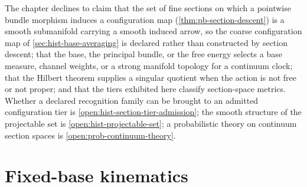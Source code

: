 The chapter declines to claim that the set of fine sections on which a
pointwise bundle morphism induces a configuration map (\cref{thm:pb-section-descent})
is a smooth submanifold carrying a smooth induced arrow, so the coarse
configuration map of \cref{sec:hist-base-averaging} is declared rather than
constructed by section descent; that the base, the principal bundle, or the
free energy selects a base measure, channel weights, or a strong manifold
topology for a continuum clock; that the Hilbert theorem supplies a singular
quotient when the action is not free or not proper; and that the tiers
exhibited here classify section-space metrics.  Whether a
declared recognition family can be brought to an admitted configuration tier is
\cref{open:hist-section-tier-admission}; the smooth structure of the projectable
set is \cref{open:hist-projectable-set}; a probabilistic theory on continuum
section spaces is \cref{open:prob-continuum-theory}.

\section{Fixed-base kinematics}
\label{sec:hist-fixed-base-kinematics}

